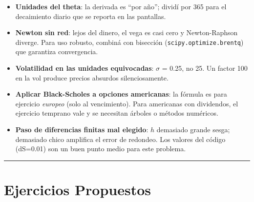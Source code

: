 \documentclass[
  spanish,
  letterpaper,
  DIV=11,
  numbers=noendperiod]{scrreprt}
\providecommand{\tightlist}{%
  \setlength{\itemsep}{0pt}\setlength{\parskip}{0pt}}
\begin{document}
\begin{tcolorbox}[enhanced jigsaw, bottomrule=.15mm, colback=white, opacitybacktitle=0.6, arc=.35mm, toprule=.15mm, opacityback=0, breakable, titlerule=0mm, left=2mm, coltitle=black, colbacktitle=quarto-callout-warning-color!10!white, colframe=quarto-callout-warning-color-frame, leftrule=.75mm, toptitle=1mm, bottomtitle=1mm, title=\textcolor{quarto-callout-warning-color}{\faExclamationTriangle}\hspace{0.5em}{Trampas frecuentes}, rightrule=.15mm]

\begin{itemize}
\tightlist
\item
  \textbf{Unidades del theta}: la derivada es ``por año''; dividí por
  365 para el decaimiento diario que se reporta en las pantallas.
\item
  \textbf{Newton sin red}: lejos del dinero, el vega es casi cero y
  Newton-Raphson diverge. Para uso robusto, combiná con bisección
  (\texttt{scipy.optimize.brentq}) que garantiza convergencia.
\item
  \textbf{Volatilidad en las unidades equivocadas}: \(\sigma\) = 0.25,
  no 25. Un factor 100 en la vol produce precios absurdos
  silenciosamente.
\item
  \textbf{Aplicar Black-Scholes a opciones americanas}: la fórmula es
  para ejercicio \emph{europeo} (solo al vencimiento). Para americanas
  con dividendos, el ejercicio temprano vale y se necesitan árboles o
  métodos numéricos.
\item
  \textbf{Paso de diferencias finitas mal elegido}: \(h\) demasiado
  grande sesga; demasiado chico amplifica el error de redondeo. Los
  valores del código (dS=0.01) son un buen punto medio para este
  problema.
\end{itemize}

\end{tcolorbox}

\begin{center}\rule{0.5\linewidth}{0.5pt}\end{center}

\chapter{Ejercicios Propuestos}\label{ejercicios-propuestos-17}
\end{document}
